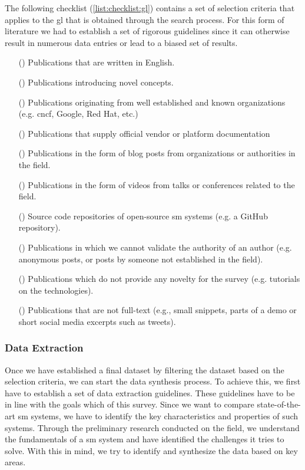 The following checklist (\cref{list:checklist:gl}) contains a set of selection criteria that applies to the \gls{gl} that is obtained through the search process. For this form of literature we had to establish a set of rigorous guidelines since it can otherwise result in numerous data entries or lead to a biased set of results. 

\begin{itemize}
    \item[(\cmark)] Publications that are written in English.
    \item[(\cmark)] Publications introducing novel concepts.
    \item[(\cmark)] Publications originating from well established and known organizations (e.g. \gls{cncf}, Google, Red Hat, etc.)
    \item[(\cmark)] Publications that supply official vendor or platform documentation
    \item[(\cmark)] Publications in the form of blog posts from organizations or authorities in the field.
    \item[(\cmark)] Publications in the form of videos from talks or conferences related to the field.
    \item[(\cmark)] Source code repositories of open-source \gls{sm} systems (e.g. a GitHub repository).
    
    \item[(\xmark)] Publications in which we cannot validate the authority of an author (e.g. anonymous posts, or posts by someone not established in the field). 
    \item[(\xmark)] Publications which do not provide any novelty for the survey (e.g. tutorials on the technologies). 
    \item[(\xmark)] Publications that are not full-text (e.g., small snippets, parts of a demo or short social media excerpts such as tweets).
    
    \label{list:checklist:gl}
\end{itemize}


\subsubsection{Data Extraction}
\label{sec:survey:methodology:review-protocol:data-extraction}


Once we have established a final dataset by filtering the dataset based on the selection criteria, we can start the data synthesis process. To achieve this, we first have to establish a set of data extraction guidelines. These guidelines have to be in line with the goals which of this survey. Since we want to compare  state-of-the-art \gls{sm} systems, we have to identify the key characteristics and properties  of such systems. Through the preliminary research conducted on the field, we understand the fundamentals of a \gls{sm} system and have identified the challenges it tries to solve. With this in mind, we try to identify and synthesize the data based on key areas.


